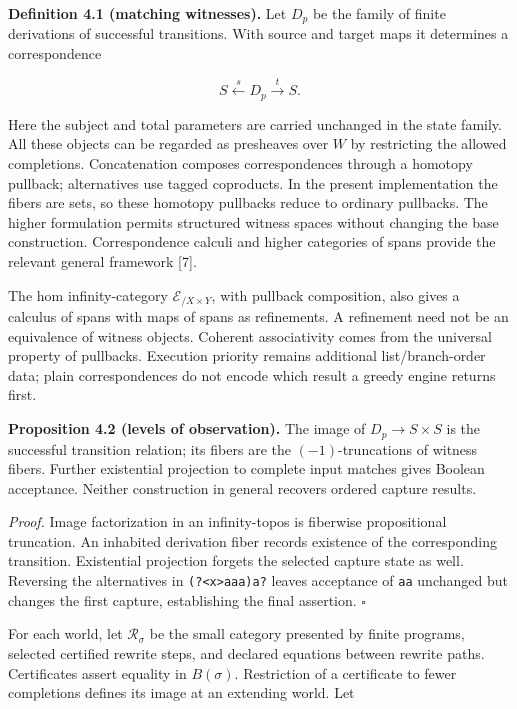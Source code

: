 \documentclass[
  11pt,
]{article}
\begin{document}
\textbf{Definition 4.1 (matching witnesses).} Let \(D_p\) be the family
of finite derivations of successful transitions. With source and target
maps it determines a correspondence

\[ S\xleftarrow{\;s\;}D_p\xrightarrow{\;t\;}S. \]

Here the subject and total parameters are carried unchanged in the state
family. All these objects can be regarded as presheaves over \(W\) by
restricting the allowed completions. Concatenation composes
correspondences through a homotopy pullback; alternatives use tagged
coproducts. In the present implementation the fibers are sets, so these
homotopy pullbacks reduce to ordinary pullbacks. The higher formulation
permits structured witness spaces without changing the base
construction. Correspondence calculi and higher categories of spans
provide the relevant general framework {[}7{]}.

The hom infinity-category \(\mathcal E_{/X\times Y}\), with pullback
composition, also gives a calculus of spans with maps of spans as
refinements. A refinement need not be an equivalence of witness objects.
Coherent associativity comes from the universal property of pullbacks.
Execution priority remains additional list/branch-order data; plain
correspondences do not encode which result a greedy engine returns
first.

\textbf{Proposition 4.2 (levels of observation).} The image of
\(D_p\to S\times S\) is the successful transition relation; its fibers
are the \((-1)\)-truncations of witness fibers. Further existential
projection to complete input matches gives Boolean acceptance. Neither
construction in general recovers ordered capture results.

\emph{Proof.} Image factorization in an infinity-topos is fiberwise
propositional truncation. An inhabited derivation fiber records
existence of the corresponding transition. Existential projection
forgets the selected capture state as well. Reversing the alternatives
in \texttt{(?\textless{}x\textgreater{}a\textbar{}aa)a?} leaves
acceptance of \texttt{aa} unchanged but changes the first capture,
establishing the final assertion. \(\square\)

For each world, let \(\mathcal R_\sigma\) be the small category
presented by finite programs, selected certified rewrite steps, and
declared equations between rewrite paths. Certificates assert equality
in \(B(\sigma)\). Restriction of a certificate to fewer completions
defines its image at an extending world. Let
\end{document}
